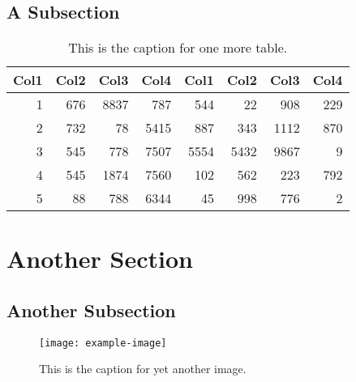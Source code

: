 \subsection{A Subsection}
\lipsum[6-8]
\begin{table}
	\centering
	\begin{tabular}{r r r r r r r r}
		Col1 & Col2 & Col3 & Col4 & Col1 & Col2 & Col3 & Col4 \\
		\hline
		1    & 676  & 8837 & 787  & 544  & 22   & 908  & 229  \\
		2    & 732  & 78   & 5415 & 887  & 343  & 1112 & 870  \\
		3    & 545  & 778  & 7507 & 5554 & 5432 & 9867 & 9    \\
		4    & 545  & 1874 & 7560 & 102  & 562  & 223  & 792  \\
		5    & 88   & 788  & 6344 & 45   & 998  & 776  & 2    \\
		\hline
	\end{tabular}
	\caption{This is the caption for one more table.}
\end{table}

\section{Another Section}
\lipsum[1-2]

\subsection{Another Subsection}
\lipsum[3]
\begin{figure}
	\centering
	\texttt{[image: example-image]}
	\caption{This is the caption for yet another image.}
\end{figure}
\lipsum[4-5]
